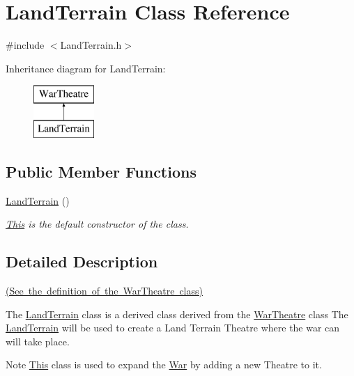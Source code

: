 \hypertarget{class_land_terrain}{}\section{Land\+Terrain Class Reference}
\label{class_land_terrain}


{\ttfamily \#include $<$Land\+Terrain.\+h$>$}

Inheritance diagram for Land\+Terrain\+:\begin{figure}[H]
\begin{center}
\leavevmode
\includegraphics[height=2.000000cm]{class_land_terrain}
\end{center}
\end{figure}
\subsection*{Public Member Functions}
\begin{DoxyCompactItemize}
\item 
\mbox{\hyperlink{class_land_terrain_a9c0220a84230c24b9c18d7c7ab8a4dde}{Land\+Terrain}} ()
\begin{DoxyCompactList}\small\item\em \mbox{\hyperlink{class_this}{This}} is the default constructor of the class. \end{DoxyCompactList}\end{DoxyCompactItemize}


\subsection{Detailed Description}
\mbox{\hyperlink{_war_theatre_8h_source}{(See the definition of the War\+Theatre class)}}

The \mbox{\hyperlink{class_land_terrain}{Land\+Terrain}} class is a derived class derived from the \mbox{\hyperlink{class_war_theatre}{War\+Theatre}} class The \mbox{\hyperlink{class_land_terrain}{Land\+Terrain}} will be used to create a Land Terrain Theatre where the war can will take place. \begin{DoxyNote}{Note}
\mbox{\hyperlink{class_this}{This}} class is used to expand the \mbox{\hyperlink{class_war}{War}} by adding a new Theatre to it. 
\end{DoxyNote}


